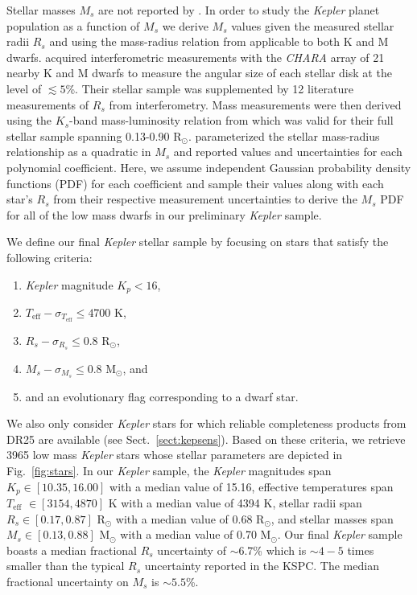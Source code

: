 \documentclass[twocolumn]{emulateapj}
\newcommand{\kepler}[1]{\emph{Kepler}#1}
\newcommand{\teff}[1]{$T_{\text{eff}}$#1}
\begin{document}
Stellar masses $M_s$ are not reported by \cite{berger18}. In order to study the \kepler{} planet population as a function of $M_s$
we derive $M_s$ values given the measured stellar radii $R_s$ and using the mass-radius relation from \cite{boyajian12} 
applicable to both K and M dwarfs.
\cite{boyajian12} acquired interferometric measurements with the \emph{CHARA} array of 21 nearby K and M dwarfs
to measure the angular size of each stellar disk at the level of $\lesssim 5$\%. Their stellar sample was supplemented by 12
literature measurements of $R_s$ from interferometry. Mass measurements were then derived using the $K_s$-band mass-luminosity
relation from \cite{henry93} which was valid for their full stellar sample spanning 0.13-0.90 R$_{\odot}$. \cite{boyajian12}
parameterized the stellar mass-radius relationship as a quadratic in $M_s$ and reported values and uncertainties for each polynomial
coefficient. Here, we assume independent Gaussian probability density functions (PDF) for each coefficient and sample their values
along with each star's $R_s$ from their respective measurement uncertainties to derive the $M_s$ PDF for all of the low mass dwarfs
in our preliminary \kepler{} sample.

We define our final \kepler{} stellar sample by focusing on stars that satisfy the following criteria:

\begin{enumerate}
\item \kepler{} magnitude $K_p < 16$,
\item $T_{\text{eff}} - \sigma_{T_{\text{eff}}} \leq 4700$ K,
\item $R_s - \sigma_{R_s} \leq 0.8$ R$_{\odot}$,
\item $M_s - \sigma_{M_s} \leq 0.8$ M$_{\odot}$, and
\item and an evolutionary flag corresponding to a dwarf star. 
\end{enumerate}

\noindent We also only consider \kepler{} stars for which reliable completeness products from DR25
are available (see Sect.~\ref{sect:kepsens}). Based on these criteria, we retrieve 3965 low mass \kepler{}
stars whose stellar parameters are depicted in Fig.~\ref{fig:stars}.
In our \kepler{} sample, the \kepler{} magnitudes span $K_p \in [10.35, 16.00]$ with a median value of 15.16,
effective temperatures span \teff{} $\in [3154, 4870]$ K with a median value of 4394 K,
stellar radii span $R_s \in [0.17, 0.87]$ R$_{\odot}$ with a median value of 0.68 R$_{\odot}$, and
stellar masses span $M_s \in [0.13, 0.88]$ M$_{\odot}$ with a median value of 0.70 M$_{\odot}$.
Our final \kepler{} sample boasts a median fractional $R_s$ uncertainty of $\sim 6.7$\% which is $\sim 4-5$
times smaller than the typical $R_s$ uncertainty reported in the KSPC. The median fractional uncertainty on
$M_s$ is $\sim 5.5$\%.
\end{document}
